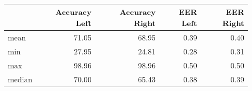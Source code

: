 \begin{tabular}{lrrrr}
\toprule
{} &  Accuracy Left &  Accuracy Right &  EER Left &  EER Right \\
\midrule
mean   &          71.05 &           68.95 &      0.39 &       0.40 \\
min    &          27.95 &           24.81 &      0.28 &       0.31 \\
max    &          98.96 &           98.96 &      0.50 &       0.50 \\
median &          70.00 &           65.43 &      0.38 &       0.39 \\
\bottomrule
\end{tabular}
